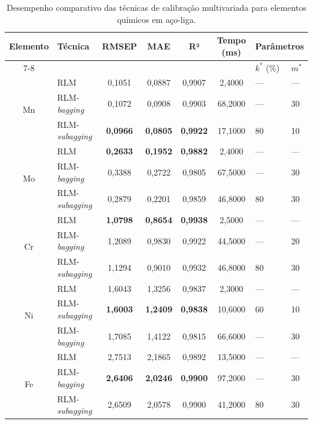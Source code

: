 \begin{table}[htbp]
\centering
\begin{threeparttable} %
\caption{Desempenho comparativo das técnicas de calibração multivariada para elementos químicos em aço-liga.}
\label{tab:baggingsubba}
\footnotesize
\begin{tabular}{clccccll} %
\toprule
\textbf{Elemento} & \textbf{Técnica} & \textbf{RMSEP} & \textbf{MAE} & \textbf{R²} & \textbf{Tempo} (ms) & \multicolumn{2}{c}{\textbf{Parâmetros}} \\ \cline{7-8}
 & & & & & & $k^*$ (\%)\tnote{b} & $m^*$\tnote{c}\\
\midrule
\multirow{3}{*}{Mn} 
  & RLM              & 0,1051 & 0,0887 & 0,9907 &  2,4000  & --- & --- \\
  & RLM-\textit{bagging}      & 0,1072 & 0,0908 & 0,9903 & 68,2000  & --- & 30 \\
  & RLM-\textit{subagging}\tnote{a} & \textbf{0,0966} & \textbf{0,0805} & \textbf{0,9922} & 17,1000  & 80 & 10 \\
\midrule
\multirow{3}{*}{Mo} 
  & RLM\tnote{a}          & \textbf{0,2633} & \textbf{0,1952} & \textbf{0,9882} &  2,4000  & --- & --- \\
  & RLM-\textit{bagging}      & 0,3388 & 0,2722 & 0,9805 & 67,5000  & --- & 30 \\
  & RLM-\textit{subagging}    & 0,2879 & 0,2201 & 0,9859 & 46,8000  & 80 & 30 \\
\midrule
\multirow{3}{*}{Cr} 
  & RLM\tnote{a}          & \textbf{1,0798} & \textbf{0,8654} & \textbf{0,9938} &  2,5000  & --- & --- \\
  & RLM-\textit{bagging}      & 1,2089 & 0,9830 & 0,9922 & 44,5000  & --- & 20 \\
  & RLM-\textit{subagging}    & 1,1294 & 0,9010 & 0,9932 & 46,8000  & 80 & 30 \\
\midrule
\multirow{3}{*}{Ni} 
  & RLM              & 1,6043 & 1,3256 & 0,9837 &  2,3000  & --- & --- \\
  & RLM-\textit{subagging}\tnote{a} & \textbf{1,6003} & \textbf{1,2409} & \textbf{0,9838} & 10,6000  & 60 & 10 \\
  & RLM-\textit{bagging}      & 1,7085 & 1,4122 & 0,9815 & 66,6000  & --- & 30 \\
\midrule
\multirow{3}{*}{Fe} 
  & RLM              & 2,7513 & 2,1865 & 0,9892 & 13,5000  & --- & --- \\
  & RLM-\textit{bagging}\tnote{a}   & \textbf{2,6406} & \textbf{2,0246} & \textbf{0,9900} & 97,2000  & --- & 30 \\
  & RLM-\textit{subagging}    & 2,6509 & 2,0578 & 0,9900 & 41,2000  & 80 & 30 \\
\bottomrule
\end{tabular}


\end{threeparttable}
\end{table}
